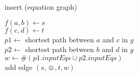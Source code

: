 \begin{algorithm}[h]
\caption[.]{insert (equation graph)}
	
	{
		$f(a,b) \leftarrow s$ \\
		$f(c,d) \leftarrow t$ \\
		$p1 \leftarrow $ shortest path between $a$ and $c$ in $g$ \\
		$p2 \leftarrow $ shortest path between $b$ and $d$ in $g$ \\
		$w \leftarrow \#(p1.inputEqs \cup p2.inputEqs) $ \\
		add edge $(s,\smiley,t,w)$ %
	}
  
  \label{algo:insert_dij}
\end{algorithm}
